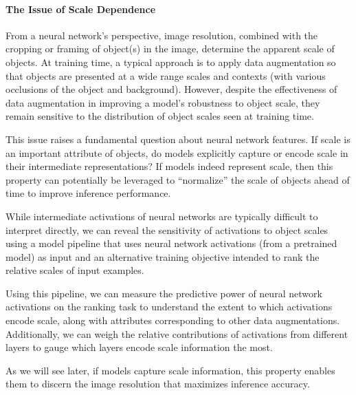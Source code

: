 \paragraph{The Issue of Scale Dependence}
From a neural network's perspective, image resolution, combined with the cropping or framing of object(s) in the image, determine the apparent scale of objects.
At training time, a typical approach is to apply data augmentation so that objects are presented at a wide range scales and contexts (with various occlusions of the object and background).
However, despite the effectiveness of data augmentation in improving a model's robustness to object scale, they remain sensitive to the distribution of object scales seen at training time.

This issue raises a fundamental question about neural network features.
If scale is an important attribute of objects, do models explicitly capture or encode scale in their intermediate representations?
If models indeed represent scale, then this property can potentially be leveraged to ``normalize'' the scale of objects ahead of time to improve inference performance.

While intermediate activations of neural networks are typically difficult to interpret directly, we can reveal the sensitivity of activations to object scales using a model pipeline that uses neural network activations (from a pretrained model) as input and an alternative training objective intended to rank the relative scales of input examples.

Using this pipeline, we can measure the predictive power of neural network activations on the ranking task to understand the extent to which activations encode scale, along with attributes corresponding to other data augmentations.
Additionally, we can weigh the relative contributions of activations from different layers to gauge which layers encode scale information the most.

As we will see later, if models capture scale information, this property enables them to discern the image resolution that maximizes inference accuracy.

